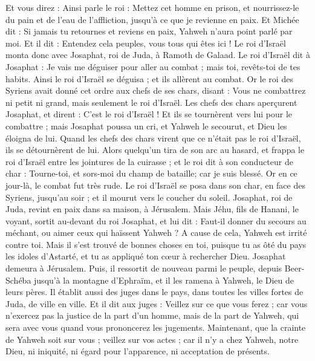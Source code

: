\begin{multicols}{2}
Et vous direz : Ainsi parle le roi : Mettez cet homme en prison, et nourrissez-le du pain et de l'eau de l'affliction, jusqu'à ce que je revienne en paix.
Et Michée dit : Si jamais tu retournes et reviens en paix, Yahweh n'aura point parlé par moi. Et il dit : Entendez cela peuples, vous tous qui êtes ici !
Le roi d'Israël monta donc avec Josaphat, roi de Juda, à Ramoth de Galaad.
Le roi d'Israël dit à Josaphat : Je vais me déguiser pour aller au combat ; mais toi, revêts-toi de tes habits. Ainsi le roi d'Israël se déguisa ; et ils allèrent au combat.
Or le roi des Syriens avait donné cet ordre aux chefs de ses chars, disant : Vous ne combattrez ni petit ni grand, mais seulement le roi d'Israël.
Les chefs des chars aperçurent Josaphat, et dirent : C'est le roi d'Israël ! Et ils se tournèrent vers lui pour le combattre ; mais Josaphat poussa un cri, et Yahweh le secourut, et Dieu les éloigna de lui.
Quand les chefs des chars virent que ce n'était pas le roi d'Israël, ils se détournèrent de lui.
Alors quelqu’un tira de son arc au hasard, et frappa le roi d'Israël entre les jointures de la cuirasse ; et le roi dit à son conducteur de char : Tourne-toi, et sors-moi du champ de bataille; car je suis blessé.
Or en ce jour-là, le combat fut très rude. Le roi d'Israël se posa dans son char, en face des Syriens, jusqu'au soir ; et il mourut vers le coucher du soleil.
\VerseOne{}Josaphat, roi de Juda, revint en paix dans sa maison, à Jérusalem.
Mais Jéhu, fils de Hanani, le voyant, sortit au-devant du roi Josaphat, et lui dit : Faut-il donner du secours au méchant, ou aimer ceux qui haïssent Yahweh ? A cause de cela, Yahweh est irrité contre toi.
Mais il s'est trouvé de bonnes choses en toi, puisque tu as ôté du pays les idoles d'Astarté, et tu as appliqué ton cœur à rechercher Dieu.
Josaphat demeura à Jérusalem. Puis, il ressortit de nouveau parmi le peuple, depuis Beer-Schéba jusqu'à la montagne d'Ephraïm, et il les ramena à Yahweh, le Dieu de leurs pères.
Il établit aussi des juges dans le pays, dans toutes les villes fortes de Juda, de ville en ville.
Et il dit aux juges : Veillez sur ce que vous ferez ; car vous n'exercez pas la justice de la part d'un homme, mais de la part de Yahweh, qui sera avec vous quand vous prononcerez les jugements.
Maintenant, que la crainte de Yahweh soit sur vous ; veillez sur vos actes ; car il n'y a chez Yahweh, notre Dieu, ni iniquité, ni égard pour l'apparence, ni acceptation de présents.

\end{multicols}
